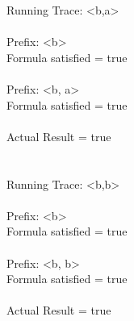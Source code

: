 \noindent Running Trace: \textless b,a\textgreater\\
\\
  Prefix: \textless b\textgreater\\
  Formula satisfied = true\\
\\
  Prefix: \textless b, a\textgreater\\
  Formula satisfied = true\\
\\
  Actual Result = true\\
\\
\\
Running Trace: \textless b,b\textgreater\\
\\
  Prefix: \textless b\textgreater\\
  Formula satisfied = true\\
\\
  Prefix: \textless b, b\textgreater\\
  Formula satisfied = true\\
\\
  Actual Result = true